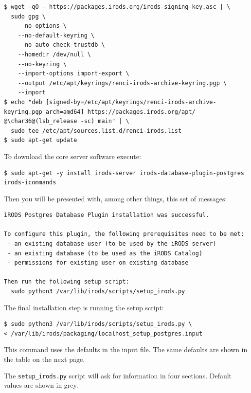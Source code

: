 \documentclass[10pt,oneside]{memoir}
\begin{document}
\begin{lstlisting}
$ wget -qO - https://packages.irods.org/irods-signing-key.asc | \
  sudo gpg \
    --no-options \
    --no-default-keyring \
    --no-auto-check-trustdb \
    --homedir /dev/null \
    --no-keyring \
    --import-options import-export \
    --output /etc/apt/keyrings/renci-irods-archive-keyring.pgp \
    --import
$ echo "deb [signed-by=/etc/apt/keyrings/renci-irods-archive-keyring.pgp arch=amd64] https://packages.irods.org/apt/ @\char36@(lsb_release -sc) main" | \
  sudo tee /etc/apt/sources.list.d/renci-irods.list
$ sudo apt-get update
\end{lstlisting}

To download the core server software execute:

\begin{lstlisting}
$ sudo apt-get -y install irods-server irods-database-plugin-postgres irods-icommands
\end{lstlisting}

Then you will be presented with, among other things, this set of messages:

\begin{lstlisting}
iRODS Postgres Database Plugin installation was successful.

To configure this plugin, the following prerequisites need to be met:
 - an existing database user (to be used by the iRODS server)
 - an existing database (to be used as the iRODS Catalog)
 - permissions for existing user on existing database

Then run the following setup script:
  sudo python3 /var/lib/irods/scripts/setup_irods.py
\end{lstlisting}

The final installation step is running the setup script:

\begin{lstlisting}
$ sudo python3 /var/lib/irods/scripts/setup_irods.py \
< /var/lib/irods/packaging/localhost_setup_postgres.input
\end{lstlisting}

This command uses the defaults in the input file.  The same defaults are shown in the table on the next page.

\newpage
The \texttt{setup\_irods.py} script will ask for information in four sections.  Default values are shown in grey.
\end{document}

